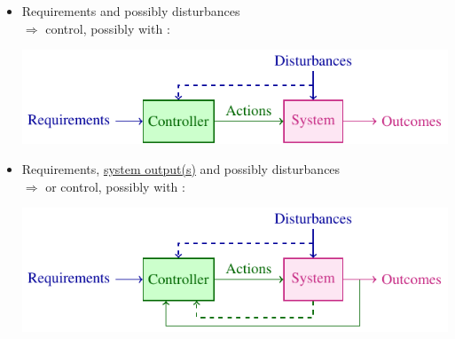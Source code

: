 \begin{frame}
\myPause
 \begin{itemize}[<+-| alert@+>]
 \item Requirements and possibly disturbances\\
       $\Rightarrow$  control, possibly with :
       \begin{center}
        \includegraphics[width=0.60\columnwidth]{./Unit-01/img/Taxonomy-OpenLoop-scheme.pdf}
       \end{center}
 \item Requirements, \underline{system output(s)} and possibly disturbances\\
       $\Rightarrow$  or  control, possibly with :
       \begin{center}
        \includegraphics[width=0.60\columnwidth]{./Unit-01/img/Taxonomy-ClosedLoop-scheme.pdf}
       \end{center}
 \end{itemize}
\end{frame}

